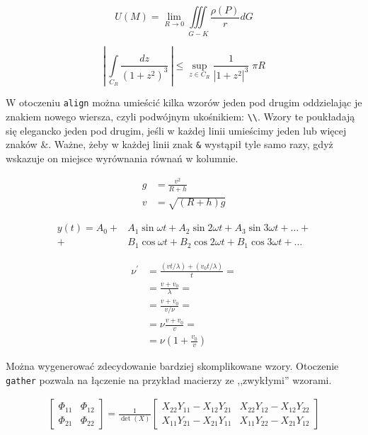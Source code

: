 \begin{equation}
    U(M) = \lim\limits_{R\to 0} \iiint\limits_{G-K}\frac{\rho(P)}{r}dG
\end{equation}

\begin{equation*}
    \left| \, \int\limits_{C_R} \frac{dz}{\left( 1+z^2 \right )^3} \, \right| \leqslant \sup\limits_{z \in C_R} \frac{1}{\left| 1+z^2 \right|^3} \; \pi R
\end{equation*}

W otoczeniu \texttt{align} można umieścić kilka wzorów jeden pod drugim oddzielając je znakiem nowego wiersza, czyli podwójnym ukośnikiem: \texttt{\textbackslash{}\textbackslash{}}. Wzory te poukładają się elegancko jeden pod drugim, jeśli w każdej linii umieścimy jeden lub więcej znaków \&. Ważne, żeby w każdej linii znak \texttt{\&} wystąpił tyle samo razy, gdyż wskazuje on miejsce wyrównania równań w kolumnie.

\begin{align}
    g & = \frac{v^2}{R+h} \\
    v & = \sqrt{ \left( R+h \right) g }
\end{align}

\begin{align}
 y(t) = A_0 
 +& A_1 \sin \omega t + 
    A_2 \sin 2 \omega t + 
    A_3 \sin 3 \omega t + \ldots + \nonumber \\
 +& B_1 \cos \omega t + 
    B_2 \cos 2 \omega t + 
    B_1 \cos 3 \omega t + \ldots
\end{align}

\begin{align}
 \nu^\prime  &= \frac{\left(vt / \lambda \right) + \left( v_0t / \lambda \right)}{t} = \nonumber\\
            &= \frac{v + v_0}{\lambda} = \nonumber\\
            &= \frac{v + v_0}{v / \nu} = \nonumber\\
            &= \nu \frac{v+v_0}{v} = \nonumber\\
            &= \nu \left( 1 + \frac{v_0}{v} \right)
\end{align}

Można wygenerować zdecydowanie bardziej skomplikowane wzory. Otoczenie \texttt{gather} pozwala na łączenie na przykład macierzy ze ,,zwykłymi'' wzorami.

\begin{gather}
 \begin{bmatrix} \Phi_{11} & \Phi_{12} \\ \Phi_{21} & \Phi_{22} \end{bmatrix}
 =
 \frac{1}{\det(X)}
  \begin{bmatrix}
   X_{22} Y_{11} - X_{12} Y_{21} &
   X_{22} Y_{12} - X_{12} Y_{22} \\
   X_{11} Y_{21} - X_{21} Y_{11} &
   X_{11} Y_{22} - X_{21} Y_{12} 
   \end{bmatrix}
\end{gather}

